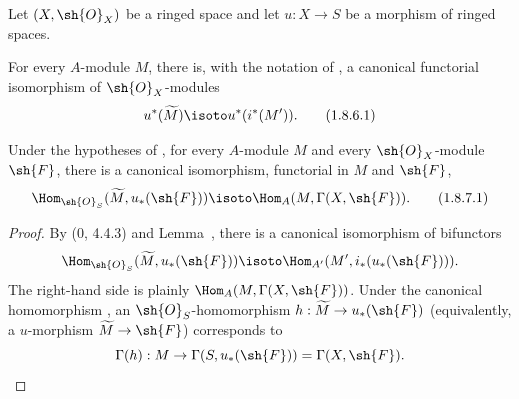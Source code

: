 \begin{corollary}[1.8.6]
\label{I.1.8.6}
Let $(X,\sh{O}_X)$ be a ringed space and let $u:X\to S$ be a morphism
of ringed spaces.

For every $A$-module $M$, there is, with the notation of
, a canonical functorial isomorphism of
$\sh{O}_X$-modules
\begin{equation}
\label{I.1.8.6.1}
  u^*(\widetilde M)\isoto u^*(i^*(M')).
\tag{1.8.6.1}
\end{equation}
\end{corollary}

\begin{corollary}[1.8.7]
\label{I.1.8.7}
Under the hypotheses of , for every $A$-module $M$ and
every $\sh{O}_X$-module $\sh{F}$, there is a canonical isomorphism,
functorial in $M$ and $\sh{F}$,
\begin{equation}
\label{I.1.8.7.1}
  \Hom_{\sh{O}_S}(\widetilde M,u_*(\sh{F}))
  \isoto\Hom_A(M,\Gamma(X,\sh{F})).
\tag{1.8.7.1}
\end{equation}
\end{corollary}

\begin{proof}
By (0, 4.4.3) and Lemma~, there is a canonical
isomorphism of bifunctors
\[
  \Hom_{\sh{O}_S}(\widetilde M,u_*(\sh{F}))
  \isoto\Hom_{A'}(M',i_*(u_*(\sh{F}))).
\]
The right-hand side is plainly $\Hom_A(M,\Gamma(X,\sh{F}))$.  Under
the canonical homomorphism , an
$\sh{O}_S$-homomorphism
$h:\widetilde M\to u_*(\sh{F})$ (equivalently, a $u$-morphism
$\widetilde M\to\sh{F}$) corresponds to
\[
  \Gamma(h):M\to\Gamma(S,u_*(\sh{F}))=\Gamma(X,\sh{F}).
\]
\end{proof}

